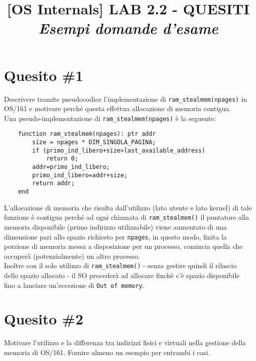 \documentclass[12pt]{article}
\title{\vspace{-1cm}
\textbf{[OS Internals] LAB 2.2 - QUESITI}\\ 
\vspace{0.3cm}
\small{\textit{Esempi domande d'esame}}}
\author{}
\date{}
\begin{document}
\maketitle

\section*{Quesito \#1}
{\color{blue}
Descrivere tramite pseudocodice l'implementazione di \texttt{ram\_stealmem(npages)} in OS/161 e motivare perch\'e questa effettua allocazione di memoria contigua. 
}\\

\noindent
Una pseudo-implementazione di \texttt{ram\_stealmem(npages)} \`e la seguente: 
\begin{verbatim}
    function ram_stealmem(npages): ptr addr
        size = npages * DIM_SINGOLA_PAGINA;
        if (primo_ind_libero+size>last_available_address)
            return 0;
        addr=primo_ind_libero; 
        primo_ind_libero=addr+size;
        return addr; 
    end
\end{verbatim}
L'allocazione di memoria che risulta dall'utilizzo (lato utente e lato kernel) di tale funzione \`e contigua perch\'e ad ogni chiamata di \texttt{ram\_stealmem()} il puntatore alla memoria disponibile (primo indirizzo utilizzabile) viene aumentato di una dimensione pari allo spazio richiesto per \texttt{npages}, in questo modo, finita la porzione di memoria messa a disposizione per un processo, comincia quella che occuper\`a (potenzialmente) un altro processo.\\
Inoltre con il solo utilizzo di \texttt{ram\_stealmem()} - senza gestire quindi il rilascio dello spazio allocato - il SO proceder\`a ad allocare finch\`e c'\`e spazio disponibile fino a lanciare un'eccezione di \texttt{Out of memory}.    

\section*{Quesito \#2}
{\color{blue}
Motivare l'utilizzo e la differenza tra indirizzi fisici e virtuali nella gestione della memoria di OS/161. Fornire almeno un esempio per entrambi i casi.
}\\
\end{document}
